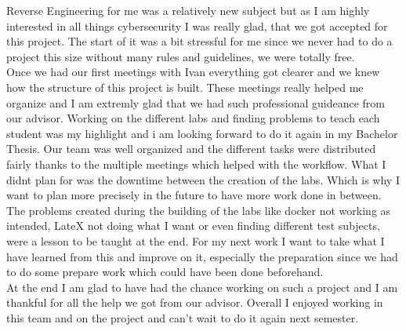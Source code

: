 Reverse Engineering for me was a relatively new subject but as I am highly interested in all things cybersecurity I was really glad, that we got accepted for this project. 
The start of it was a bit stressful for me since we never had to do a project this size without many rules and guidelines, we were totally free. \\
Once we had our first meetings with Ivan everything got clearer and we knew how the structure of this project is built. 
These meetings really helped me organize and I am extremly glad that we had such professional guideance from our advisor. 
Working on the different labs and finding problems to teach each student was my highlight and i am looking forward to do it again in my Bachelor Thesis. 
Our team was well organized and the different tasks were distributed fairly thanks to the multiple meetings which helped with the workflow.  
What I didnt plan for was the downtime between the creation of the labs. Which is why I want to plan more precisely in the future to have more work done in between.
The problems created during the building of the labs like docker not working as intended, LateX not doing what I want or even finding different test subjects, were a lesson to be taught at the end. 
For my next work I want to take what I have learned from this and improve on it, especially the preparation since we had to do some prepare work which could have been done beforehand. \\
At the end I am glad to have had the chance working on such a project and I am thankful for all the help we got from our advisor. 
Overall I enjoyed working in this team and on the project and can't wait to do it again next semester.

